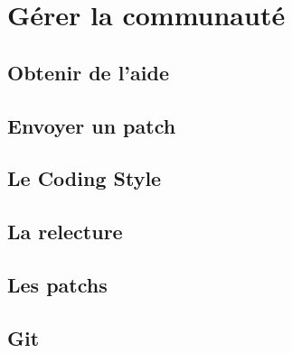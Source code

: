 %
%

\section{Gérer la communauté}
\subsection{Obtenir de l'aide}
\subsection{Envoyer un patch}
\subsection{Le Coding Style}
\subsection{La relecture}
\subsection{Les patchs}
\subsection{Git}










